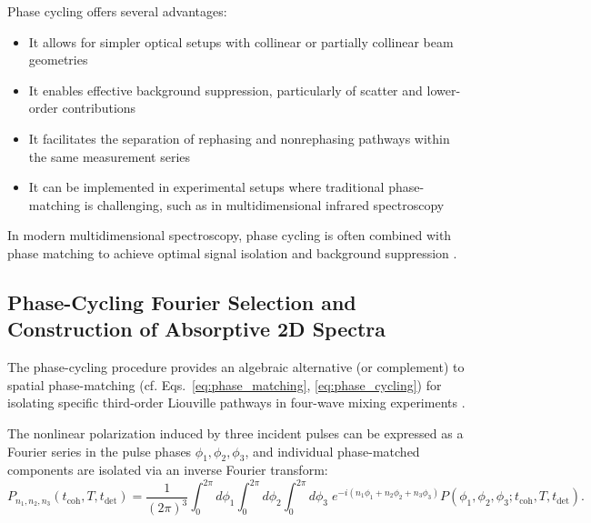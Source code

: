 \noindent 
Phase cycling offers several advantages:

\begin{itemize}
	\item It allows for simpler optical setups with collinear or partially collinear beam geometries
	\item It enables effective background suppression, particularly of scatter and lower-order contributions
	\item It facilitates the separation of rephasing and nonrephasing pathways within the same measurement series
	\item It can be implemented in experimental setups where traditional phase-matching is challenging, such as in multidimensional infrared spectroscopy
\end{itemize}

\noindent 
In modern multidimensional spectroscopy, phase cycling is often combined with phase matching to achieve optimal signal isolation and background suppression \cite{huang-fuetal2024developmentphasecyclinginterfacespecific, tianetal2003femtosecondphasecoherenttwodimensional}.


\subsection{Phase-Cycling Fourier Selection and Construction of Absorptive 2D Spectra}
\label{subsec:phase_cycling_fourier_selection}

\noindent 
The phase-cycling procedure provides an algebraic alternative (or complement) to spatial phase-matching (cf. Eqs.~\eqref{eq:phase_matching}, \eqref{eq:phase_cycling}) for isolating specific third-order Liouville pathways in four-wave mixing experiments \cite{mukamel1995principlesnonlinearoptical, cho2009twodimensionalopticalspectroscopy, jonas2003twodimensionalfemtosecondspectroscopy, brixneretal2004phasestabilizedtwodimensionalelectronic, greenetal2024vibrationalcoherenceshalfbroadband}.

\noindent 
The nonlinear polarization induced by three incident pulses can be expressed as a Fourier series in the pulse phases $\phi_1, \phi_2, \phi_3$, and individual phase-matched components are isolated via an inverse Fourier transform:
\begin{equation}
	P_{n_1,n_2,n_3}(t_{\text{coh}},T,t_{\text{det}}) =
	\frac{1}{(2\pi)^3} \int_{0}^{2\pi} \!\! d\phi_1
	\int_{0}^{2\pi} \!\! d\phi_2
	\int_{0}^{2\pi} \!\! d\phi_3 \;
	e^{-i(n_1\phi_1+n_2\phi_2+n_3\phi_3)}
	P(\phi_1,\phi_2,\phi_3;t_{\text{coh}},T,t_{\text{det}}).
	\label{eq:continuous_phase_cycling}
\end{equation}

